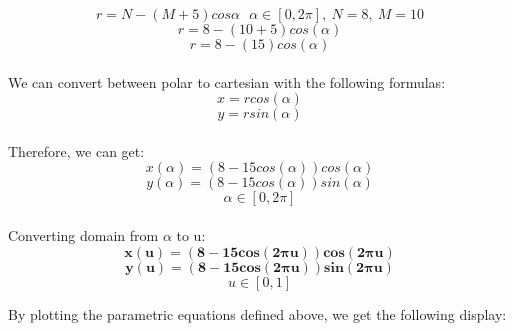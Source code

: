 \documentclass[acmlarge,nonacm=true]{acmart}
\begin{document}
\begin{displaymath}
	r = N - (M+5) cos \alpha \ \ \ \alpha \in [0, 2\pi],\ N = 8,\ M = 10
\end{displaymath}
\begin{displaymath}
	r = 8 - (10 + 5) cos(\alpha)
\end{displaymath}
\begin{displaymath}
	r = 8 - (15) cos(\alpha)
\end{displaymath}
\\We can convert between polar to cartesian with the following formulas:
\begin{displaymath}
	x = rcos(\alpha)
\end{displaymath}
\begin{displaymath}
	y = rsin(\alpha)
\end{displaymath}
\\Therefore, we can get:
\begin{displaymath}
	x(\alpha) =  (8 - 15cos(\alpha))cos(\alpha)
\end{displaymath}
\begin{displaymath}
	y(\alpha) =  (8 - 15cos(\alpha))sin(\alpha)
\end{displaymath}
\begin{displaymath}
	\alpha \in [0, 2\pi]
\end{displaymath}
\\Converting domain from \(\alpha\) to u:
\begin{displaymath}
	\mathbf{x(u) =  (8 - 15cos(2\pi u))cos(2\pi u)}
\end{displaymath}
\begin{displaymath}
	\mathbf{y(u) =  (8 - 15cos(2\pi u))sin(2\pi u)}
\end{displaymath}
\begin{displaymath}
	u \in [0, 1]
\end{displaymath}

By plotting the parametric equations defined above, we get the following display:
\end{document}
